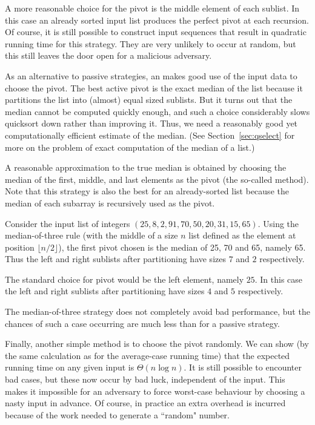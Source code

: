 A more reasonable choice for the pivot is the middle element of each sublist. 
In this case an already sorted input list produces the perfect pivot at each 
recursion. Of course, it is still possible to construct  input sequences that 
result in quadratic running time for this strategy. They are very unlikely to 
occur at random, but this still leaves the door open for a malicious adversary. 

As an alternative to passive strategies, an  
makes good use of the input data to choose the pivot. The best active pivot is 
the exact median of the list because it partitions the list into (almost) 
equal sized sublists. But it turns out that the median cannot be computed 
quickly enough, and such a choice considerably slows quicksort down rather than 
improving it. Thus, we need a reasonably good yet computationally efficient 
estimate of the median. (See Section~\ref{sec:qselect} for more on the problem of 
exact computation of the  median of a list.)

A reasonable approximation to the true median is obtained by choosing the 
median of the first, middle, and last elements as the pivot 
(the so-called  method). Note that this strategy is 
also the best for an already-sorted list because the median of each subarray 
is recursively used as the pivot.

\begin{Example}
\label{ex:qs-pivot}
Consider the input list of integers $(25, 8, 2, 91, 70, 50, 20, 31, 15, 65)$. Using the 
median-of-three rule (with the middle of a size $n$ list defined as the element 
at position $\lfloor n/2\rfloor$), the first pivot chosen is the median of 25, 
70 and 65, namely 65. Thus the left and right sublists after partitioning have 
sizes $7$ and $2$ respectively.

The standard choice for pivot would be the left element, namely $25$. In this 
case the left and right sublists after partitioning have sizes $4$ and $5$ 
respectively.
\end{Example}

The median-of-three  strategy does not completely avoid bad performance, 
but the chances of such a case occurring are much less than for a passive 
strategy. 

Finally, another simple method is to choose the pivot randomly. We can 
show (by the same calculation as for the average-case running time) 
that the expected running time on any given input is $\Theta(n \log n)$. It is 
still possible to encounter bad cases, but these now occur by bad luck, 
independent of the input. This makes it impossible for an adversary to force 
worst-case behaviour by choosing a nasty input in advance. 
Of course, in practice an extra overhead is incurred because of the work needed 
to generate a ``random" number. 

